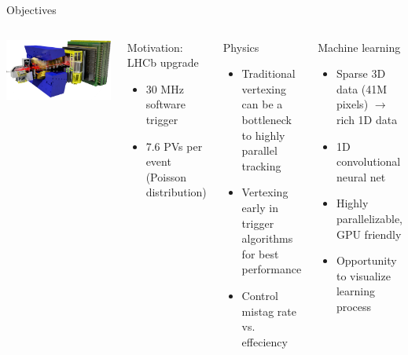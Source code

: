 \begin{frame}{Objectives}

    \begin{columns}[c]
      \includegraphics[width=\textwidth, trim=0 0 0 0]{images/LHCbDet.png}
      \begin{block}{Motivation: LHCb upgrade}
        \begin{itemize}
            \item 30 MHz software trigger
            \item 7.6 PVs per event (Poisson distribution)
        \end{itemize}
      \end{block}

    \begin{block}{Physics}
    \begin{itemize}
        \item Traditional vertexing can be a bottleneck to highly parallel tracking
        \item Vertexing early in trigger algorithms for best performance
        \item Control mistag rate vs. effeciency
    \end{itemize}
    \end{block}

    \begin{block}{Machine learning}
    \begin{itemize}
        \item Sparse 3D data (41M pixels) $\to$ rich 1D data
        \item 1D convolutional neural net
        \item Highly parallelizable, GPU friendly
        \item Opportunity to visualize learning process
    \end{itemize}
    \end{block}

\end{columns}
\end{frame}
